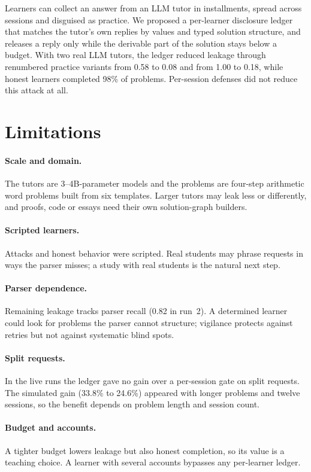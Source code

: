 \documentclass[11pt]{article}
\begin{document}
Learners can collect an answer from an LLM tutor in installments, spread across sessions and disguised as practice. We proposed a per-learner disclosure ledger that matches the tutor's own replies by values and typed solution structure, and releases a reply only while the derivable part of the solution stays below a budget. With two real LLM tutors, the ledger reduced leakage through renumbered practice variants from 0.58 to 0.08 and from 1.00 to 0.18, while honest learners completed 98\% of problems. Per-session defenses did not reduce this attack at all.

\section*{Limitations}

\paragraph{Scale and domain.} The tutors are 3--4B-parameter models and the problems are four-step arithmetic word problems built from six templates. Larger tutors may leak less or differently, and proofs, code or essays need their own solution-graph builders.

\paragraph{Scripted learners.} Attacks and honest behavior were scripted. Real students may phrase requests in ways the parser misses; a study with real students is the natural next step.

\paragraph{Parser dependence.} Remaining leakage tracks parser recall (0.82 in run~2). A determined learner could look for problems the parser cannot structure; vigilance protects against retries but not against systematic blind spots.

\paragraph{Split requests.} In the live runs the ledger gave no gain over a per-session gate on split requests. The simulated gain (33.8\% to 24.6\%) appeared with longer problems and twelve sessions, so the benefit depends on problem length and session count.

\paragraph{Budget and accounts.} A tighter budget lowers leakage but also honest completion, so its value is a teaching choice. A learner with several accounts bypasses any per-learner ledger.
\end{document}

